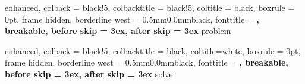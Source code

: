 \usepackage{titlesec}
\usepackage[many]{tcolorbox}
\usepackage{graphics}
\usepackage{float}
\usepackage{multirow}
\usepackage{float}
\usepackage{caption}
\usepackage{amssymb}
\usepackage{amsmath}
\usepackage{lineno}
\usepackage{algorithm}
\usepackage{algorithmic}
\usepackage{multirow}
\usepackage{graphics}
\usepackage{bm}
\usepackage{float}
\usepackage{listings}
\usepackage{color}
\usepackage{graphicx}



\titlespacing*{\chapter}{0cm}{-2.0cm}{0.50cm}
\titlespacing*{\section}{0cm}{0.50cm}{0.25cm}

\setlength{\parindent}{0pt}
\setlength{\parskip}{1ex}



%
    {enhanced,
    colback = black!5, %
    colbacktitle = black!5,
    coltitle = black,
    boxrule = 0pt,
    frame hidden,
    borderline west = {0.5mm}{0.0mm}{black},
    fonttitle = \bfseries\sffamily,
    breakable,
    before skip = 3ex,
    after skip = 3ex
}{problem}

%
{enhanced,
	colback = black!5, %
	colbacktitle = black,
	coltitle=white,
	boxrule = 0pt,
	frame hidden,
	borderline west = {0.5mm}{0.0mm}{black},
	fonttitle = \bfseries\sffamily,
	breakable,
	before skip = 3ex,
	after skip = 3ex
}{solve}

